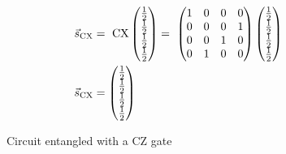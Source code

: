 \begin{equation}
    \centering
    \begin{split}
        \vec{s}_{\mathrm{CX}} &=\ \mathrm{CX}\begin{pmatrix}
            \frac{1}{2}\\\frac{1}{2}\\\frac{1}{2}\\\frac{1}{2}
        \end{pmatrix} =\  \begin{pmatrix}
        1 & 0 & 0 & 0 \\
        0 & 0 & 0 & 1 \\
        0 & 0 & 1 & 0 \\
        0 & 1 & 0 & 0
    \end{pmatrix}\begin{pmatrix}
            \frac{1}{2}\\\frac{1}{2}\\\frac{1}{2}\\\frac{1}{2}
        \end{pmatrix} \\
        \vec{s}_{\mathrm{CX}} &= \begin{pmatrix}
            \frac{1}{2}\\\frac{1}{2}\\\frac{1}{2}\\\frac{1}{2}
        \end{pmatrix}
    \end{split}
    \label{equation:cx_entanglement}
\end{equation}


\begin{figure}[!h]
    \centering
    \caption{Circuit entangled with a $\mathrm{CZ}$ gate}
    \label{fig:cz_entanglement}
\end{figure}

